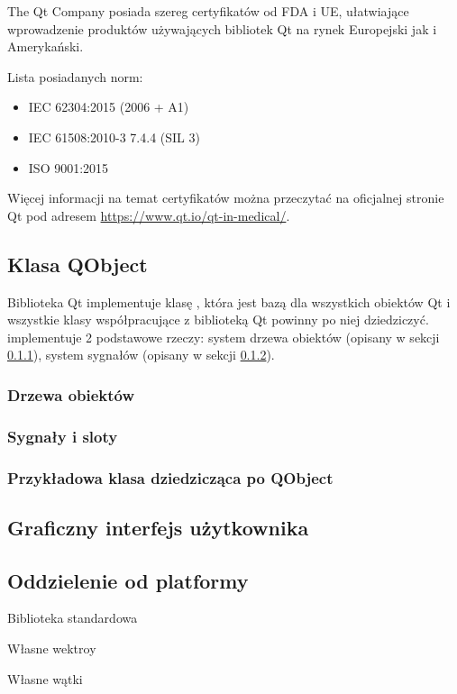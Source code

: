 \par
The Qt Company posiada szereg certyfikatów od FDA i UE, ułatwiające wprowadzenie produktów używających bibliotek Qt na rynek Europejski jak i Amerykański.
\par
Lista posiadanych norm:
\begin{itemize}
    \item IEC 62304:2015 (2006 + A1)
    \item IEC 61508:2010-3 7.4.4 (SIL 3)
    \item ISO 9001:2015 
\end{itemize}
Więcej informacji na temat certyfikatów można przeczytać na oficjalnej stronie Qt pod adresem \url{https://www.qt.io/qt-in-medical/}.

\subsection{Klasa QObject}

\par
Biblioteka Qt implementuje klasę , która jest bazą dla wszystkich obiektów Qt i wszystkie klasy współpracujące z biblioteką Qt powinny po niej dziedziczyć.
 implementuje 2 podstawowe rzeczy: system drzewa obiektów (opisany w sekcji \ref{sec:qt-pareting}), system sygnałów (opisany w sekcji \ref{sec:qt-signals}).

\subsubsection{Drzewa obiektów}
\label{sec:qt-pareting}


\subsubsection{Sygnały i sloty}
\label{sec:qt-signals}


\subsubsection{Przykładowa klasa dziedzicząca po QObject}


\subsection{Graficzny interfejs użytkownika}
\label{sec:qt-gui}


\subsection{Oddzielenie od platformy}

Biblioteka standardowa

Własne wektroy

Własne wątki
